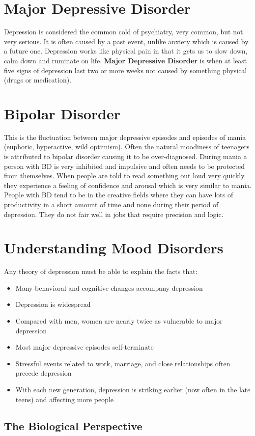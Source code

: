 \documentclass[12pt]{article}
\begin{document}
\section*{Major Depressive Disorder}
Depression is considered the common cold of psychiatry, very common, but not very serious. It is often caused by a past event, unlike anxiety which is caused by a future one. Depression works like physical pain in that it gets us to slow down, calm down and ruminate on life. \textbf{Major Depressive Disorder} is when at least five signs of depression last two or more weeks not caused by something physical (drugs or medication).
\section*{Bipolar Disorder}
This is the fluctuation between major depressive episodes and episodes of mania (euphoric, hyperactive, wild optimism). Often the natural moodiness of teenagers is attributed to bipolar disorder causing it to be over-diagnosed. During mania a person with BD is very inhibited and impulsive and often needs to be protected from themselves. When people are told to read something out loud very quickly they experience a feeling of confidence and arousal which is very similar to mania. People with BD tend to be in the creative fields where they can have lots of productivity in a short amount of time and none during their period of depression. They do not fair well in jobs that require precision and logic. 
\section*{Understanding Mood Disorders}
Any theory of depression must be able to explain the facts that:
\begin{itemize}
\item Many behavioral and cognitive changes accompany depression 
\item Depression is widespread
\item Compared with men, women are nearly twice as vulnerable to major depression
\item Most major depressive episodes self-terminate
\item Stressful events related to work, marriage, and close relationships often precede
depression
\item With each new generation, depression is striking earlier (now often in the late
teens) and affecting more people
\end{itemize}
\subsection*{The Biological Perspective}
\end{document}
